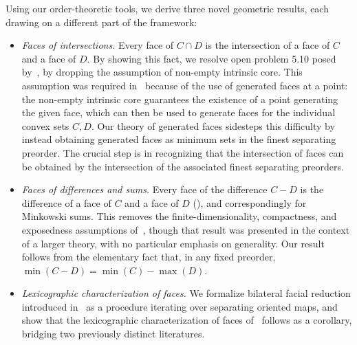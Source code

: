 \documentclass{article}
\theoremstyle{plain}
\theoremstyle{definition}
\theoremstyle{remark}
\begin{document}
Using our order-theoretic tools, we derive three novel geometric results, each drawing on a different part of the framework:
\begin{itemize}
\item \emph{Faces of intersections.} Every face of $C \cap D$ is the intersection of a face of $C$ and a face of $D$. By showing this fact, we resolve open problem 5.10 posed by~\textcite{weisNoteFacesConvex2025}, by dropping the assumption of non-empty intrinsic core. This assumption was required in~\cite{weisNoteFacesConvex2025} because of the use of generated faces at a point: the non-empty intrinsic core guarantees the existence of a point generating the given face, which can then be used to generate faces for the individual convex sets $C,D$. Our theory of generated faces sidesteps this difficulty by instead obtaining generated faces as minimum sets in the finest separating preorder. The crucial step is in recognizing that the intersection of faces can be obtained by the intersection of the associated finest separating preorders.
\item \emph{Faces of differences and sums.} Every face of the difference $C - D$ is the difference of a face of $C$ and a face of $D$ (), and correspondingly for Minkowski sums. This removes the finite-dimensionality, compactness, and exposedness assumptions of~\cite[Theorem 1.7.5]{schneider_ConvexBodiesBrunn_2013}, though that result was presented in the context of a larger theory, with no particular emphasis on generality. Our result follows from the elementary fact that, in any fixed preorder, $\min (C-D) = \min(C) - \max(D)$.
\item \emph{Lexicographic characterization of faces.} We formalize bilateral facial reduction introduced in~\cite{scottBilateralFacialReduction2026} as a procedure iterating over separating oriented maps, and show that the lexicographic characterization of faces of~\textcite{martinez-legaz_LEXICOGRAPHICALCHARACTERIZATIONFACES_} follows as a corollary, bridging two previously distinct literatures.
\end{itemize}
\end{document}
